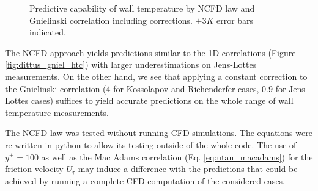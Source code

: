\begin{figure}[h!]
\centering
{} 
\caption{Predictive capability of wall temperature by NCFD law and Gnielinski correlation including corrections. $\pm 3K$ error bars indicated.}
\label{fig:ncfd_gniel_corr_htc}
\end{figure}

The NCFD approach yields predictions similar to the 1D correlations (Figure \ref{fig:dittus_gniel_htc}) with larger underestimations on Jens-Lottes measurements. On the other hand, we see that applying a constant correction to the Gnielinski correlation (4 for Kossolapov and Richenderfer cases, 0.9 for Jens-Lottes cases) suffices to yield accurate predictions on the whole range of wall temperature measurements. 

\begin{remark*}{}
The NCFD law was tested without running CFD simulations. The equations were re-written in python to allow its testing outside of the whole code. The use of $y^{+}=100$ as well as the Mac Adams correlation (Eq. \ref{eq:utau_macadams}) for the friction velocity $U_{\tau}$ may induce a difference with the predictions that could be achieved by running a complete CFD computation of the considered cases.
\end{remark*}

